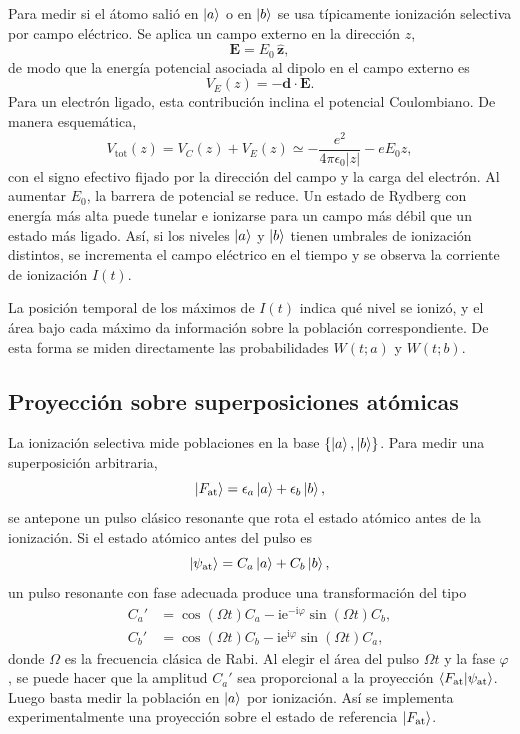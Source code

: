 \documentclass[11pt]{article}
\newcommand{\ii}{\mathrm{i}}
\newcommand{\ee}{\mathrm{e}}
\begin{document}
Para medir si el \'atomo sali\'o en $\ket{a}$ o en $\ket{b}$ se usa
t\'ipicamente ionizaci\'on selectiva por campo el\'ectrico. Se aplica un campo
externo en la direcci\'on $z$,
\begin{equation}
  \mathbf E=E_0\,\hat{\mathbf z},
\end{equation}
de modo que la energ\'ia potencial asociada al dipolo en el campo externo es
\begin{equation}
  V_E(z)=-\mathbf d\cdot\mathbf E.
\end{equation}
Para un electr\'on ligado, esta contribuci\'on inclina el potencial
Coulombiano. De manera esquem\'atica,
\begin{equation}
  V_{\mathrm{tot}}(z)
  =
  V_C(z)+V_E(z)
  \simeq
  -\frac{e^2}{4\pi\epsilon_0|z|}
  -
  eE_0 z,
\end{equation}
con el signo efectivo fijado por la direcci\'on del campo y la carga del
electr\'on. Al aumentar $E_0$, la barrera de potencial se reduce. Un estado de
Rydberg con energ\'ia m\'as alta puede tunelar e ionizarse para un campo m\'as
d\'ebil que un estado m\'as ligado. As\'i, si los niveles $\ket{a}$ y
$\ket{b}$ tienen umbrales de ionizaci\'on distintos, se incrementa el campo
el\'ectrico en el tiempo y se observa la corriente de ionizaci\'on $I(t)$.

La posici\'on temporal de los m\'aximos de $I(t)$ indica qu\'e nivel se
ioniz\'o, y el \'area bajo cada m\'aximo da informaci\'on sobre la poblaci\'on
correspondiente. De esta forma se miden directamente las probabilidades
$W(t;a)$ y $W(t;b)$.

\subsection{Proyecci\'on sobre superposiciones at\'omicas}

La ionizaci\'on selectiva mide poblaciones en la base $\{\ket{a},\ket{b}\}$.
Para medir una superposici\'on arbitraria,
\begin{equation}
  \ket{F_{\mathrm{at}}}
  =
  \epsilon_a\ket{a}
  +
  \epsilon_b\ket{b},
\end{equation}
se antepone un pulso cl\'asico resonante que rota el estado at\'omico antes de
la ionizaci\'on. Si el estado at\'omico antes del pulso es
\begin{equation}
  \ket{\psi_{\mathrm{at}}}
  =
  C_a\ket{a}+C_b\ket{b},
\end{equation}
un pulso resonante con fase adecuada produce una transformaci\'on del tipo
\begin{align}
  C_a'
  &=
  \cos(\Omega t)C_a
  -
  \ii \ee^{-\ii\varphi}\sin(\Omega t)C_b,
  \\
  C_b'
  &=
  \cos(\Omega t)C_b
  -
  \ii \ee^{\ii\varphi}\sin(\Omega t)C_a,
\end{align}
donde $\Omega$ es la frecuencia cl\'asica de Rabi. Al elegir el \'area del
pulso $\Omega t$ y la fase $\varphi$, se puede hacer que la amplitud $C_a'$
sea proporcional a la proyecci\'on
$\braket{F_{\mathrm{at}}|\psi_{\mathrm{at}}}$. Luego basta medir la
poblaci\'on en $\ket{a}$ por ionizaci\'on. As\'i se implementa
experimentalmente una proyecci\'on sobre el estado de referencia
$\ket{F_{\mathrm{at}}}$.
\end{document}
